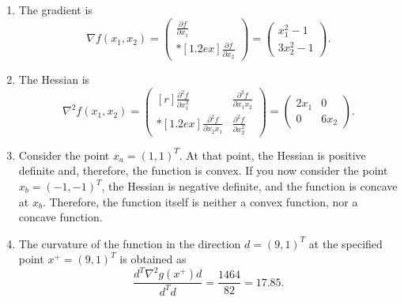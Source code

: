 \begin{enumerate}
\item
The gradient is
$$\nabla f(x_1,x_2) = \begin{pmatrix}
    \frac{\partial f}{\partial x_1}\\*[1.2ex]
    \frac{\partial f}{\partial x_2}
\end{pmatrix} =
\begin{pmatrix}
    x_1^2-1 \\
    3x_2^2-1
\end{pmatrix}.$$

\item The Hessian is
$$\nabla^2 f(x_1,x_2) = \begin{pmatrix*}[r]
    \frac{\partial^2 f}{\partial x_1^2} & \frac{\partial^2 f}{\partial x_1x_2} \\*[1.2ex]
    \frac{\partial^2 f}{\partial x_2x_1} & \frac{\partial^2 f}{\partial x_2^2}
\end{pmatrix*} =
\begin{pmatrix*}
    2x_1 & 0 \\
    0 & 6x_2
\end{pmatrix*}.$$

\item Consider the point $x_a=(1,1)^T$. At that point, the Hessian is
  positive definite and, therefore, the function is convex. If you now
  consider the point $x_b=(-1,-1)^T$, the Hessian is negative
  definite, and the function is concave at $x_b$. Therefore, the
  function itself is neither a convex function, nor a concave
  function. 

\item 
The curvature of the function in the direction $d=(9,1)^T$ at the
specified point $x^+=(9,1)^T$ is obtained as
$$\frac{d^T\nabla^2 g(x^+) d} {d^T d} = \frac{1464}{82} = 17.85.$$

\end{enumerate}


